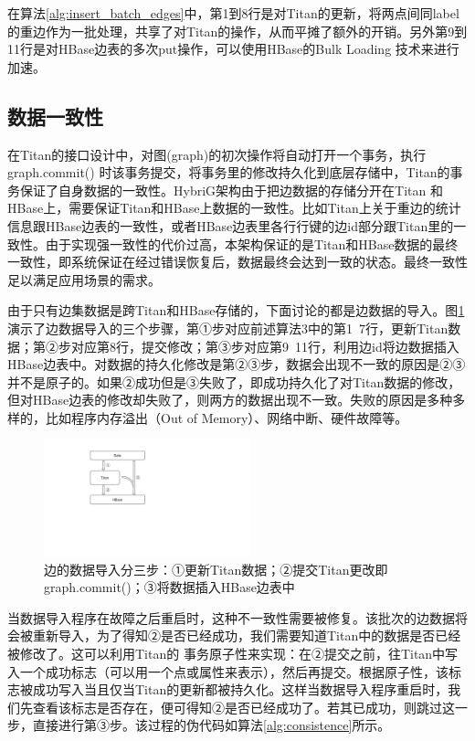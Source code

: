 在算法\ref{alg:insert_batch_edges}中，第1到8行是对Titan的更新，将两点间同label的重边作为一批处理，共享了对Titan的操作，从而平摊了额外的开销。另外第9到11行是对HBase边表的多次put操作，可以使用HBase的Bulk Loading 技术来进行加速。

\subsection{数据一致性}
在Titan的接口设计中，对图(graph)的初次操作将自动打开一个事务，执行 graph.commit() 时该事务提交，将事务里的修改持久化到底层存储中，Titan的事务保证了自身数据的一致性。HybriG架构由于把边数据的存储分开在Titan 和 HBase上，需要保证Titan和HBase上数据的一致性。比如Titan上关于重边的统计信息跟HBase边表的一致性，或者HBase边表里各行行键的边id部分跟Titan里的一致性。由于实现强一致性的代价过高，本架构保证的是Titan和HBase数据的最终一致性\supercite{eventually_consistent}，即系统保证在经过错误恢复后，数据最终会达到一致的状态。最终一致性足以满足应用场景的需求。

由于只有边集数据是跨Titan和HBase存储的，下面讨论的都是边数据的导入。图\ref{fig:insert_steps}演示了边数据导入的三个步骤，第①步对应前述算法3中的第1~7行，更新Titan数据；第②步对应第8行，提交修改；第③步对应第9~11行，利用边id将边数据插入HBase边表中。对数据的持久化修改是第②③步，数据会出现不一致的原因是②③并不是原子的。如果②成功但是③失败了，即成功持久化了对Titan数据的修改，但对HBase边表的修改却失败了，则两方的数据出现不一致。失败的原因是多种多样的，比如程序内存溢出（Out of Memory）、网络中断、硬件故障等。

\begin{figure}[htbp]
\centering
\includegraphics[width=60mm]{fig/insert_steps.pdf}
\caption[插入边数据的三个阶段]{边的数据导入分三步：①更新Titan数据；②提交Titan更改即graph.commit()；③将数据插入HBase边表中}
\label{fig:insert_steps}
\end{figure}

当数据导入程序在故障之后重启时，这种不一致性需要被修复。该批次的边数据将会被重新导入，为了得知②是否已经成功，我们需要知道Titan中的数据是否已经被修改了。这可以利用Titan的
事务原子性来实现：在②提交之前，往Titan中写入一个成功标志（可以用一个点或属性来表示），然后再提交。根据原子性，该标志被成功写入当且仅当Titan的更新都被持久化。这样当数据导入程序重启时，我们先查看该标志是否存在，便可得知②是否已经成功了。若其已成功，则跳过这一步，直接进行第③步。该过程的伪代码如算法\ref{alg:consistence}所示。

